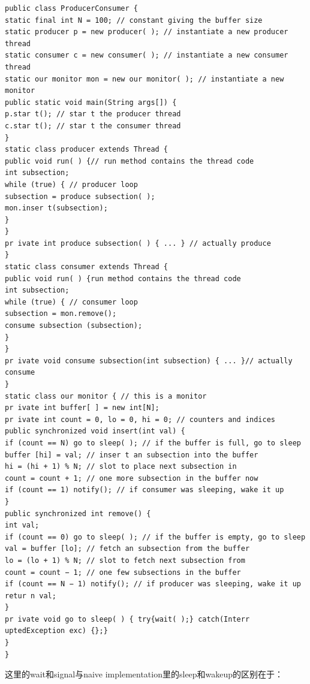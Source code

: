 \documentclass[a4paper]{article}
\begin{document}
\begin{centering}
\begin{verbatim}
public class ProducerConsumer {
static final int N = 100; // constant giving the buffer size
static producer p = new producer( ); // instantiate a new producer thread
static consumer c = new consumer( ); // instantiate a new consumer thread
static our monitor mon = new our monitor( ); // instantiate a new monitor
public static void main(String args[]) {
p.star t(); // star t the producer thread
c.star t(); // star t the consumer thread
}
static class producer extends Thread {
public void run( ) {// run method contains the thread code
int subsection;
while (true) { // producer loop
subsection = produce subsection( );
mon.inser t(subsection);
}
}
pr ivate int produce subsection( ) { ... } // actually produce
}
static class consumer extends Thread {
public void run( ) {run method contains the thread code
int subsection;
while (true) { // consumer loop
subsection = mon.remove();
consume subsection (subsection);
}
}
pr ivate void consume subsection(int subsection) { ... }// actually consume
}
static class our monitor { // this is a monitor
pr ivate int buffer[ ] = new int[N];
pr ivate int count = 0, lo = 0, hi = 0; // counters and indices
public synchronized void insert(int val) {
if (count == N) go to sleep( ); // if the buffer is full, go to sleep
buffer [hi] = val; // inser t an subsection into the buffer
hi = (hi + 1) % N; // slot to place next subsection in
count = count + 1; // one more subsection in the buffer now
if (count == 1) notify(); // if consumer was sleeping, wake it up
}
public synchronized int remove() {
int val;
if (count == 0) go to sleep( ); // if the buffer is empty, go to sleep
val = buffer [lo]; // fetch an subsection from the buffer
lo = (lo + 1) % N; // slot to fetch next subsection from
count = count − 1; // one few subsections in the buffer
if (count == N − 1) notify(); // if producer was sleeping, wake it up
retur n val;
}
pr ivate void go to sleep( ) { try{wait( );} catch(Interr uptedException exc) {};}
}
}
\end{verbatim}
\end{centering}

这里的wait和signal与naive implementation里的sleep和wakeup的区别在于：
\end{document}
